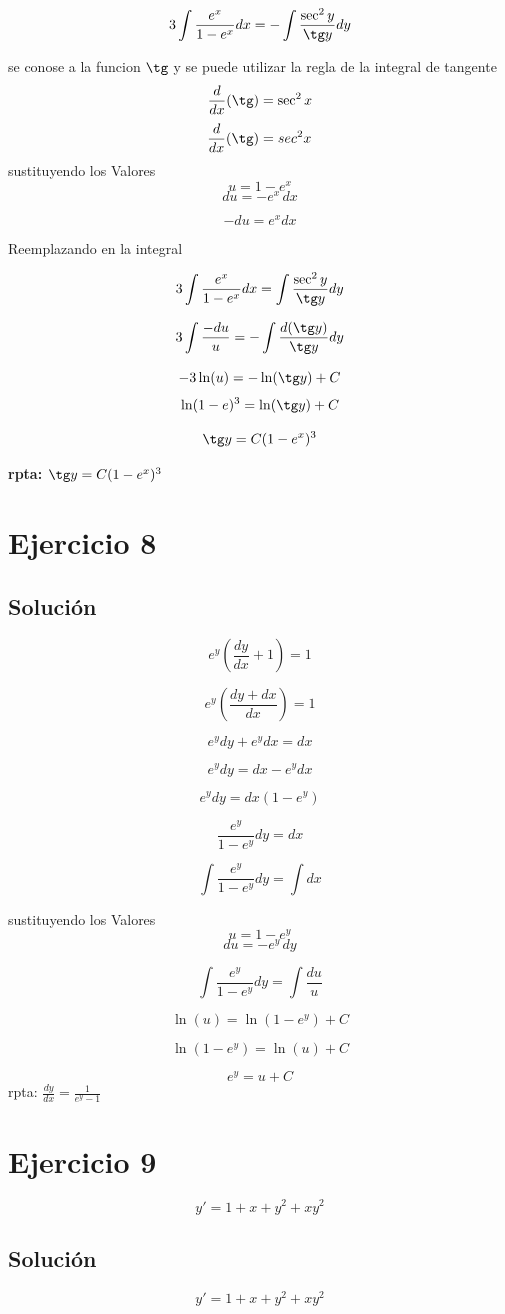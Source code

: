 \documentclass[12pt,a4paper]{article}
\begin{document}
\begin{multicols}{2}
\[3\int\frac{e^x}{1-e^x}dx=-\int\frac{\sec^2 y}{\tg y}dy\]  

se conose a la funcion $\tg$ y se puede utilizar la regla de la integral de tangente \[\frac{d}{dx}(\tg)=\sec^2x\]
\[\frac{d}{dx}(\tg)=sec^2x\] 
sustituyendo los Valores \[u=1-e^x\] \[du=-e^x\,dx\] 

\[-du=e^xdx\]

Reemplazando en la integral 

\[3\int\frac{e^x}{1-e^x}dx=\int\frac{\sec^2 y}{\tg y}dy\] 

\[3\int\frac{-du}{u}=-\int\frac{d(\tg y)}{\tg y}dy\] 

\[-3\ln(u)=-\ln(\tg y)+C\] \[\ln(1-e)^3=\ln(\tg y)+C\] 

\[\tg y=C(1-e^x)^3\] 

\textbf{rpta: $\tg y=C(1-e^x)^3$}

\section*{Ejercicio 8}
\subsection*{Solución}
\[e^y(\frac{dy}{dx}+1)=1\]

\[e^y\left(\frac{dy +dx}{dx}\right)=1\]

\[e^ydy+e^ydx=dx\]

\[e^ydy=dx-e^ydx\]

\[e^ydy=dx(1-e^y)\]

\[\frac{e^y}{1-e^y}dy=dx\]

\[\int\frac{e^y}{1-e^y}dy=\int dx\]

sustituyendo los Valores \[u=1-e^y\] \[du=-e^y\,dy\] 

\[\int\frac{e^y}{1-e^y}dy=\int\frac{du}{u}\]

\[\ln(u)=\ln(1-e^y)+C\]

\[\ln(1-e^y)=\ln(u)+C\]

\[e^y=u+C\]
rpta: $\frac{dy}{dx}=\frac{1}{e^y-1}$
\section*{Ejercicio 9}

\[y\prime=1+x+y^2+xy^2\]

\subsection*{Solución}
\[y\prime=1+x+y^2+xy^2\]


\end{multicols}
\end{document}
